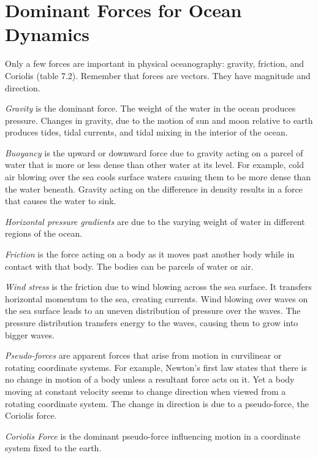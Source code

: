 \section{Dominant Forces for Ocean Dynamics}
Only a few forces are important in
physical oceanography: gravity, friction, and Coriolis (table
7.2). Remember that forces are vectors. They have magnitude and
direction.

\begin{enumerate}
\vitem \textit{Gravity} is the dominant
force. The weight of the water in the ocean produces pressure. Changes
in gravity, due to the motion of sun and moon
relative to earth produces tides, tidal currents, and tidal
mixing in the interior of the ocean.

\textit{Buoyancy} is the upward or downward
force due to gravity acting on a parcel of water that is more or less
dense than other water at its level. For example, cold air blowing
over the sea cools surface waters causing them to be more dense than
the water beneath. Gravity acting on the difference in density results
in a force that causes the water to sink.

\textit{Horizontal pressure gradients} are due to the varying weight of water in
different regions of the ocean.

\vitem \textit{Friction} is the force acting on
a body as it moves past another body while in contact with that
body. The bodies can be parcels of water or air.

\textit{Wind stress} is the friction due to wind
blowing across the sea surface. It transfers horizontal momentum to
the sea, creating currents. Wind blowing over waves on the sea surface
leads to an uneven distribution of pressure over the waves. The
pressure distribution transfers energy to the waves, causing them to
grow into bigger waves.

\vitem\textit{Pseudo-forces} are apparent
forces that arise from motion in curvilinear or rotating coordinate
systems. For example, Newton's first law states that there is no
change in motion of a body unless a resultant force acts on it. Yet a
body moving at constant velocity seems to change direction when viewed
from a rotating coordinate system. The change in direction is due to a
pseudo-force, the Coriolis force.

\textit{Coriolis Force} is the dominant
pseudo-force influencing motion in a coordinate system fixed to the
earth.
\end{enumerate}
\vspace{-1ex}

